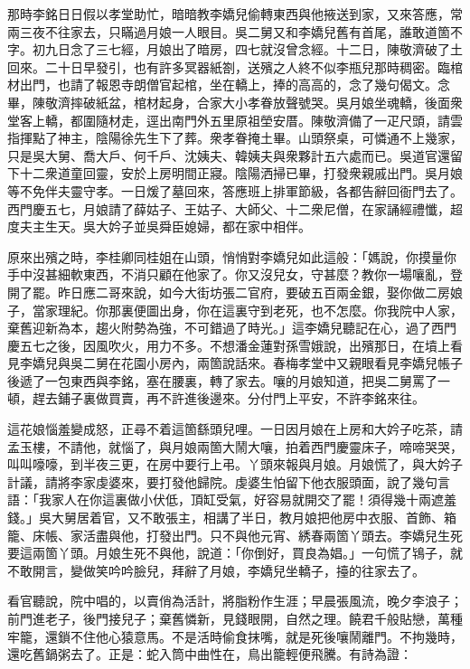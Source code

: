 那時李銘日日假以孝堂助忙，暗暗教李嬌兒偷轉東西與他掖送到家，又來答應，常兩三夜不往家去，只瞞過月娘一人眼目。吳二舅又和李嬌兒舊有首尾，誰敢道箇不字。初九日念了三七經，月娘出了暗房，四七就沒曾念經。十二日，陳敬濟破了土回來。二十日早發引，也有許多冥器紙劄，送殯之人終不似李瓶兒那時稠密。臨棺材出門，也請了報恩寺朗僧官起棺，坐在轎上，捧的高高的，念了幾句偈文。念畢，陳敬濟摔破紙盆，棺材起身，合家大小孝眷放聲號哭。吳月娘坐魂轎，後面衆堂客上轎，都圍隨材走，逕出南門外五里原祖塋安厝。陳敬濟備了一疋尺頭，請雲指揮點了神主，陰陽徐先生下了葬。衆孝眷掩土畢。山頭祭桌，可憐通不上幾家，只是吳大舅、喬大戶、何千戶、沈姨夫、韓姨夫與衆夥計五六處而已。吳道官還留下十二衆道童回靈，安於上房明間正寢。陰陽洒掃已畢，打發衆親戚出門。吳月娘等不免伴夫靈守孝。一日煖了墓回來，答應班上排軍節級，各都告辭回衙門去了。西門慶五七，月娘請了薛姑子、王姑子、大師父、十二衆尼僧，在家誦經禮懺，超度夫主生天。吳大妗子並吳舜臣媳婦，都在家中相伴。

原來出殯之時，李桂卿同桂姐在山頭，悄悄對李嬌兒如此這般：「媽說，你摸量你手中沒甚細軟東西，不消只顧在他家了。你又沒兒女，守甚麼？教你一場嚷亂，登開了罷。{}昨日應二哥來說，如今大街坊張二官府，要破五百兩金銀，娶你做二房娘子，當家理紀。你那裏便圖出身，你在這裏守到老死，也不怎麼。你我院中人家，棄舊迎新為本，趨火附勢為強，不可錯過了時光。」這李嬌兒聽記在心，過了西門慶五七之後，因風吹火，用力不多。不想潘金蓮對孫雪娥說，出殯那日，在墳上看見李嬌兒與吳二舅在花園小房內，兩箇說話來。春梅孝堂中又親眼看見李嬌兒帳子後遞了一包東西與李銘，塞在腰裏，轉了家去。{}嚷的月娘知道，把吳二舅罵了一頓，趕去鋪子裏做買賣，再不許進後邊來。分付門上平安，不許李銘來往。

這花娘惱羞變成怒，正尋不着這箇繇頭兒哩。一日因月娘在上房和大妗子吃茶，請孟玉樓，不請他，就惱了，與月娘兩箇大鬧大嚷，拍着西門慶靈床子，啼啼哭哭，叫叫嚎嚎，到半夜三更，在房中要行上弔。丫頭來報與月娘。月娘慌了，與大妗子計議，請將李家虔婆來，要打發他歸院。虔婆生怕留下他衣服頭面，說了幾句言語：「我家人在你這裏做小伏低，頂缸受氣，好容易就開交了罷！須得幾十兩遮羞錢。」{}吳大舅居着官，又不敢張主，相講了半日，教月娘把他房中衣服、首飾、箱籠、床帳、家活盡與他，打發出門。只不與他元宵、綉春兩箇丫頭去。李嬌兒生死要這兩箇丫頭。月娘生死不與他，說道：「你倒好，買良為娼。」一句慌了鴇子，就不敢開言，變做笑吟吟臉兒，拜辭了月娘，李嬌兒坐轎子，擡的往家去了。

看官聽說，院中唱的，以賣俏為活計，將脂粉作生涯；早晨張風流，晚夕李浪子；前門進老子，後門接兒子；棄舊憐新，見錢眼開，自然之理。饒君千般貼戀，萬種牢籠，還鎖不住他心猿意馬。不是活時偷食抹嘴，就是死後嚷鬧離門。不拘幾時，還吃舊鍋粥去了。正是：蛇入筒中曲性在，鳥出籠輕便飛騰。有詩為證：

